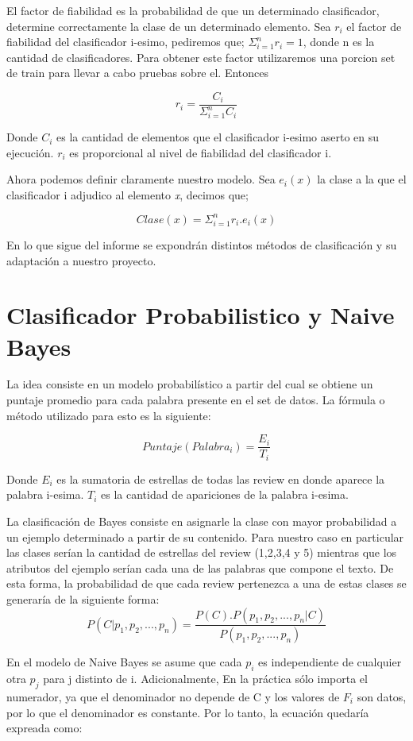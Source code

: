 \documentclass[a4paper,11pt]{report}
\begin{document}
El factor de fiabilidad es la probabilidad de que un determinado clasificador, determine correctamente la clase de un determinado elemento. Sea $ r_{i} $ el factor de fiabilidad del clasificador i-esimo, pediremos que; $ \Sigma ^{n} _{i = 1} r_{i} = 1 $, donde n es la cantidad de clasificadores. Para obtener este factor utilizaremos una porcion set de train para llevar a cabo pruebas sobre el. Entonces

\[ r_{i} = \frac{C_{i}}{\Sigma ^{n}_{i=1} C_{i}} \]

Donde $ C_{i} $ es la cantidad de elementos que el clasificador i-esimo aserto en su ejecución. $ r_{i} $ es proporcional al nivel de fiabilidad del clasificador i. 

Ahora podemos definir claramente nuestro modelo. Sea $ e_{i}(x) $ la clase a la que el clasificador i adjudico al elemento \textit{x}, decimos que;

\[ Clase(x) = \Sigma _{i=1}^{n}r_{i} . e_{i}(x) \]

En lo que sigue del informe se expondrán distintos métodos de clasificación y su adaptación a nuestro proyecto.

\chapter{Clasificador Probabilistico y Naive Bayes}
La idea consiste en un modelo probabilístico a partir del cual se obtiene un puntaje promedio para cada palabra presente en el set de datos. La fórmula o método utilizado para esto es la siguiente:

\[ Puntaje(Palabra_{i}) = \frac{E_{i}}{T_{i}} \]

Donde $ E_{i} $ es la sumatoria de estrellas de todas las review en donde aparece la palabra i-esima. $T_{i}$ es la cantidad de apariciones de la palabra i-esima.

La clasificación de Bayes consiste en asignarle la clase con mayor probabilidad a un ejemplo determinado a partir de su contenido. Para nuestro caso en particular las clases serían la cantidad de estrellas del review (1,2,3,4 y 5) mientras que los atributos del ejemplo serían cada una de las palabras que compone el texto. De esta forma, la probabilidad de que cada review pertenezca a una de estas clases se generaría de la siguiente forma:
\[ P(C|p_{1}, p_{2},...,p_{n}) = \frac{P(C).P(p_{1}, p_{2},...,p_{n}|C)}{P(p_{1}, p_{2},...,p_{n})} \]

En el modelo de Naive Bayes se asume que cada $ p_{i} $ es independiente de cualquier otra $ p_{j} $ para j distinto de i.  Adicionalmente, En la práctica sólo importa el numerador, ya que el denominador no depende de C y los valores de $ F_{i} $ son datos, por lo que el denominador es constante. Por lo tanto, la ecuación quedaría expreada como: 
\end{document}
